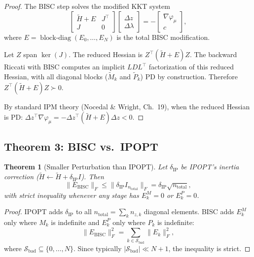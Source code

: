 \documentclass[11pt]{article}
\newtheorem{theorem}{Theorem}
\DeclareMathOperator{\blockdiag}{block\text{-}diag}
\begin{document}
\begin{proof}
The BISC step solves the modified KKT system
\begin{equation}
  \begin{bmatrix} \tilde{H} + E & J^\top \\ J & 0 \end{bmatrix}
  \begin{bmatrix} \Delta z \\ \Delta \lambda \end{bmatrix}
  = -\begin{bmatrix} \nabla \varphi_\mu \\ c \end{bmatrix},
\end{equation}
where $E = \blockdiag(E_0, \dots, E_N)$ is the total BISC modification.

Let $Z$ span $\ker(J)$. The reduced Hessian is
$Z^\top(\tilde{H} + E)Z$. The backward Riccati with BISC computes an implicit
$LDL^\top$ factorization of this reduced Hessian, with all diagonal blocks
($\tilde{M}_k$ and $\tilde{P}_k$) PD by construction. Therefore
$Z^\top(\tilde{H} + E)Z \succ 0$.

By standard IPM theory (Nocedal \& Wright, Ch.~19), when the reduced Hessian
is PD:
$\Delta z^\top \nabla \varphi_\mu = -\Delta z^\top(\tilde{H} + E)\Delta z < 0$.
\end{proof}


\subsection{Theorem 3: BISC vs.\ IPOPT}

\begin{theorem}[Smaller Perturbation than IPOPT]\label{thm:ipopt}
Let $\delta_{\mathrm{IP}}$ be IPOPT's inertia correction
($\tilde{H} \leftarrow \tilde{H} + \delta_{\mathrm{IP}} I$). Then
\begin{equation}
  \|E_{\mathrm{BISC}}\|_F \le \|\delta_{\mathrm{IP}} I_{n_{\mathrm{total}}}\|_F
  = \delta_{\mathrm{IP}} \sqrt{n_{\mathrm{total}}},
\end{equation}
with strict inequality whenever any stage has $E_k^M = 0$ or $E_k^P = 0$.
\end{theorem}

\begin{proof}
IPOPT adds $\delta_{\mathrm{IP}}$ to all $n_{\mathrm{total}} = \sum_k n_{z,k}$
diagonal elements. BISC adds $E_k^M$ only where $M_k$ is indefinite and $E_k^P$
only where $P_k$ is indefinite:
\begin{equation}
  \|E_{\mathrm{BISC}}\|_F^2 = \sum_{k \in \mathcal{S}_{\mathrm{bad}}} \|E_k\|_F^2,
\end{equation}
where $\mathcal{S}_{\mathrm{bad}} \subseteq \{0, \dots, N\}$. Since typically
$|\mathcal{S}_{\mathrm{bad}}| \ll N+1$, the inequality is strict.
\end{proof}
\end{document}
